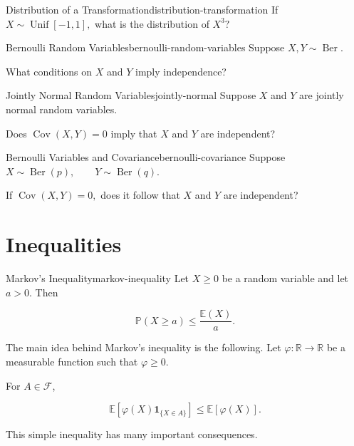 
\begin{question}{Distribution of a Transformation}{distribution-transformation}
If
\(
    X\sim\operatorname{Unif}[-1,1],
\)
what is the distribution of
\(
    X^3?
\)
\end{question}

\begin{question}{Bernoulli Random Variables}{bernoulli-random-variables}
Suppose
\(
    X,Y\sim\operatorname{Ber}.
\)

What conditions on $X$ and $Y$ imply independence?
\end{question}

\begin{question}{Jointly Normal Random Variables}{jointly-normal}
Suppose $X$ and $Y$ are jointly normal random variables.

Does
\(
    \operatorname{Cov}(X,Y)=0
\)
imply that $X$ and $Y$ are independent?
\end{question}

\begin{question}{Bernoulli Variables and Covariance}{bernoulli-covariance}
Suppose
\(
    X\sim\operatorname{Ber}(p),
    \qquad
    Y\sim\operatorname{Ber}(q).
\)

If
\(
    \operatorname{Cov}(X,Y)=0,
\)
does it follow that $X$ and $Y$ are independent?
\end{question}


\section{Inequalities}

\begin{definition}{Markov's Inequality}{markov-inequality}
Let $X\geq 0$ be a random variable and let $a>0$. Then

\[
    \mathbb{P}(X\geq a)
    \leq
    \frac{\mathbb{E}(X)}{a}.
\]
\end{definition}

\begin{remark}
The main idea behind Markov's inequality is the following.
Let
\(
    \varphi:\mathbb{R}\to\mathbb{R}
\)
be a measurable function such that
\(
    \varphi\geq 0.
\)

For $A\in\mathcal{F}$,

\[
    \mathbb{E}
    \left[
        \varphi(X)\mathbf{1}_{\{X\in A\}}
    \right]
    \leq
    \mathbb{E}[\varphi(X)].
\]

This simple inequality has many important consequences.
\end{remark}

